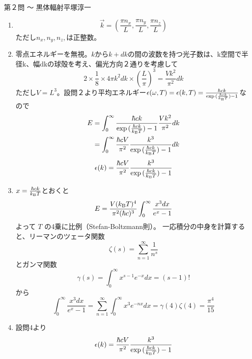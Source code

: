 \begin{answer}{第２問 〜 黒体輻射}{平塚淳一}
\begin{enumerate}
  一方高温では、$\kB T\gg\hbar \omega$よりエネルギー準位はほぼ連続的なものとみなすことができ、温度上昇によるエネルギー増加は$\kB T$がそのまま効く。
\item 
  \begin{equation}
  \overrightarrow{k}=(\frac{\pi n_x}{L},\frac{\pi n_y}{L},\frac{\pi n_z}{L})
  \end{equation}
  ただし$n_x,n_y,n_z,$は正整数。
\item 零点エネルギーを無視。$k$から$k+dk$の間の波数を持つ光子数は、k空間で半径k、幅dkの球殻を考え、偏光方向２通りを考慮して
  \begin{equation}
  2\times \frac{1}{8} \times 4\pi k^2dk \times (\frac{L}{\pi})^3
  =\frac{Vk^2}{\pi^2}dk
  \end{equation}
  ただし$V=L^3$。設問２より平均エネルギー$\epsilon(\omega,T)=\epsilon(k,T)
  =\frac{\hbar ck}{\exp{(\frac{\hbar ck}{k_\mathrm{B}T})}-1}$なので
  \begin{align}
  E&=\int_0^{\infty} \frac{\hbar ck}{\exp{(\frac{\hbar ck}{k_\mathrm{B}T})}-1} \frac{Vk^2}{\pi^2}dk\\
  &=\int_0^{\infty} \frac{\hbar cV}{\pi^2} \frac{k^3}{\exp{(\frac{\hbar ck}{k_\mathrm{B}T})}-1}dk
  \end{align}
  \begin{equation}
  \epsilon(k)=\frac{\hbar cV}{\pi^2} \frac{k^3}{\exp{(\frac{\hbar ck}{k_\mathrm{B}T})}-1}
  \end{equation}
\item $x=\frac{\hbar ck}{k_\mathrm{B} T}$とおくと
  \begin{equation}
  E=\frac{V(k_\mathrm{B} T)^4}{\pi^2(\hbar c)^3}\int_0^{\infty}\frac{x^3dx}{e^x-1}
  \end{equation}
  よって $T$ の4乗に比例（Stefan-Boltzmann則）。
  一応積分の中身を計算すると、リーマンのツェータ関数
  \begin{equation}
  \zeta(s)=\sum_{n=1}^{\infty}\frac{1}{n^s}
  \end{equation}
  とガンマ関数
  \begin{equation}
  \gamma(s)=\int_0^{\infty}x^{s-1}e^{-x}dx=(s-1)!
  \end{equation}
  から
  \begin{equation}
  \int_0^{\infty}\frac{x^3dx}{e^x-1}
  =\sum_{n=1}^{\infty}\int_0^{\infty}x^3e^{-nx}dx
  =\gamma(4)\zeta(4)
  =\frac{\pi^4}{15}
  \end{equation}
\item 設問4より
  \begin{equation}
  \epsilon(k)=\frac{\hbar cV}{\pi^2} \frac{k^3}{\exp{(\frac{\hbar ck}{\kB T})}-1}

\end{equation}
\end{enumerate}
\end{answer}
